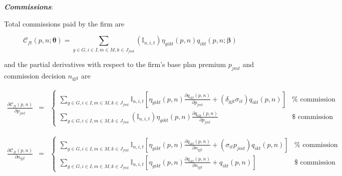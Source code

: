 \documentclass[12pt]{article}
\begin{document}
	\vspace{-0.1in}
	
\noindent \textit{\bf Commissions}:
	
\noindent Total commissions paid by the firm are	
	
	\vspace{-0.3in}		
	
		$$
		\mathcal{C}_{ft}(\textit{p},\textit{n};\boldsymbol{\theta}) = \sum_{g \in G, i \in I, m \in M, k \in J_{fmt}} \left( \mathbb{I}_{n,i,t} \right)   \eta_{gikt}(\textit{p},\textit{n}) q_{ikt}(\textit{p},\textit{n};\boldsymbol{\beta})
		$$	
	
			
	
\noindent and the partial derivatives with respect to the firm's base plan premium $p_{jmt}$ and commission decision $n_{gjt}$ are 			
	
	
	
	
\vspace{-0.4in}		
		
		\begin{eqnarray*}
		\frac{\partial \mathcal{C}_{ft}(\textit{p},\textit{n})}{\partial p_{jmt}} &=& \begin{cases} \sum_{g \in G, i \in I,m \in M, k \in J_{fmt}} \mathbb{I}_{n,i,t} \left[ \eta_{gikt}(\textit{p},\textit{n}) \frac{ \partial q_{ikt}(\textit{p},\textit{n})}{\partial p_{jmt}} +  \left(\delta_{gjt} \sigma_{it} \right)  q_{ikt}(\textit{p},\textit{n})  \right] &  \mathrm{\% \,\, commission} \\
		  \sum_{g \in G, i \in I, m \in M, k \in J_{fmt}} \left( \mathbb{I}_{n,i,t}\right) \eta_{gikt}(\textit{p},\textit{n}) \frac{ \partial q_{ikt}(\textit{p},\textit{n})}{\partial p_{jmt}}  & \mathrm{\$ \,\, commission}
		\end{cases}
		\end{eqnarray*}
		
		
	
	
\vspace{-0.4in}
	\singlespacing	

		 \begin{eqnarray*}
	\frac{\partial \mathcal{C}_{ft}(\textit{p},\textit{n})}{\partial n_{gjt}} &=& \begin{cases} 
		\sum_{g \in G, i \in I, m \in M, k \in J_{fmt}} \mathbb{I}_{n,i,t} \left[\eta_{gikt}(\textit{p},\textit{n}) \frac{\partial q_{ikt}(\textit{p},\textit{n})}{\partial n_{gjt}} +  \left(\sigma_{it} p_{jmt} \right) q_{ikt}(\textit{p},\textit{n})   \right]   & \mathrm{\% \,\, commission} \\		
		\sum_{g \in G, i \in I, m \in M, k \in J_{fmt}} \mathbb{I}_{n,i,t} \left[\eta_{gikt}(\textit{p},\textit{n}) \frac{\partial q_{ikt}(\textit{p},\textit{n})}{\partial n_{gjt}} + q_{ikt}(\textit{p},\textit{n})  \right]  & \mathrm{\$ \,\, commission}
   \end{cases}
	\end{eqnarray*}
				
\end{document}
